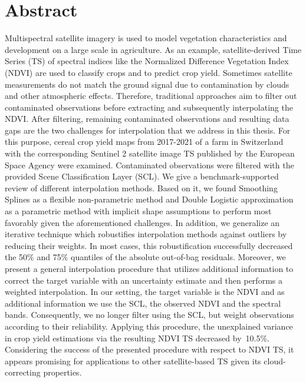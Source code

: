 \chapter*{Abstract}

Multispectral satellite imagery is used to model vegetation characteristics and development on a large scale in agriculture. As an example, satellite-derived Time Series (TS) of spectral indices like the Normalized Difference Vegetation Index (NDVI) are used to classify crops and to predict crop yield. 
Sometimes satellite measurements do not match the ground signal due to contamination by clouds and other atmospheric effects. Therefore, traditional approaches aim to filter out contaminated observations before extracting and subsequently interpolating the NDVI. After filtering, remaining contaminated observations and resulting data gaps are the two challenges for interpolation that we address in this thesis.
For this purpose, cereal crop yield maps from 2017-2021 of a farm in Switzerland with the corresponding Sentinel 2 satellite image TS published by the European Space Agency were examined. Contaminated observations were filtered with the provided Scene Classification Layer (SCL). 
We give a benchmark-supported review of different interpolation methods. Based on it, we found Smoothing Splines as a flexible non-parametric method and Double Logistic approximation as a parametric method with implicit shape assumptions to perform most favorably given the aforementioned challenges. In addition, we generalize an iterative technique which robustifies interpolation methods against outliers by reducing their weights. In most cases, this robustification successfully decreased the 50\% and 75\% quantiles of the absolute out-of-bag residuals. 
Moreover, we present a general interpolation procedure that utilizes additional information to correct the target variable with an uncertainty estimate and then performs a weighted interpolation. In our setting, the target variable is the NDVI and as additional information we use the SCL, the observed NDVI and the spectral bands. Consequently, we no longer filter using the SCL, but weight observations according to their reliability. %
Applying this procedure, the unexplained variance in crop yield estimations via the resulting NDVI TS decreased by~10.5\%. 
Considering the success of the presented procedure with respect to NDVI TS, it appears promising for applications to other satellite-based TS given its cloud-correcting properties.

